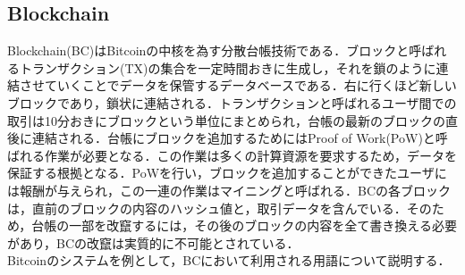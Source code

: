 \documentclass[japanese, macos]{KU2}
\begin{document}
\subsection{Blockchain}
Blockchain(BC)はBitcoin\cite{nakamoto2008bitcoin}の中核を為す分散台帳技術である．ブロックと呼ばれるトランザクション(TX)の集合を一定時間おきに生成し，それを鎖のように連結させていくことでデータを保管するデータベースである．右に行くほど新しいブロックであり，鎖状に連結される．トランザクションと呼ばれるユーザ間での取引は10分おきにブロックという単位にまとめられ，台帳の最新のブロックの直後に連結される．台帳にブロックを追加するためにはProof of Work(PoW)と呼ばれる作業が必要となる．この作業は多くの計算資源を要求するため，データを保証する根拠となる．PoWを行い，ブロックを追加することができたユーザには報酬が与えられ，この一連の作業はマイニングと呼ばれる．BCの各ブロックは，直前のブロックの内容のハッシュ値と，取引データを含んでいる．そのため，台帳の一部を改竄するには，その後のブロックの内容を全て書き換える必要があり，BCの改竄は実質的に不可能とされている．\\
Bitcoinのシステムを例として，BCにおいて利用される用語について説明する．
\end{document}
